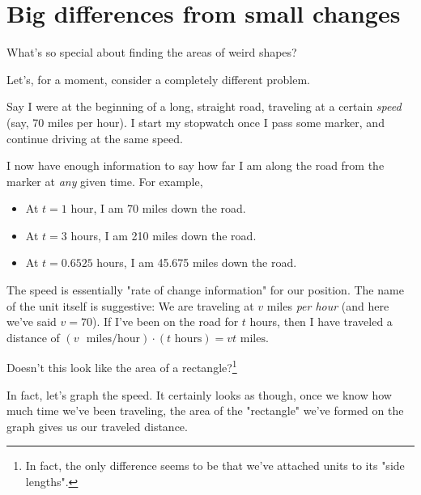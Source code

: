 \documentclass{article}
\begin{document}




\section{Big differences from small changes}



What's so special about finding the areas of weird shapes?

Let's, for a moment, consider a completely different problem.

Say I were at the beginning of a long, straight road, traveling at a certain \emph{speed} (say, 70 miles per hour). I start my stopwatch once I pass some marker, and continue driving at the same speed.

I now have enough information to say how far I am along the road from the marker at \emph{any} given time. For example, 

\begin{itemize}
\item At $t = 1$ hour, I am 70 miles down the road.
\item At $t = 3$ hours, I am 210 miles down the road.
\item At $t = 0.6525$ hours, I am 45.675 miles down the road.
\end{itemize}

The speed is essentially "rate of change information" for our position. The name of the unit itself is suggestive: We are traveling at $v$ miles \emph{per hour} (and here we've said $v = 70$). If I've been on the road for $t$ hours, then I have traveled a distance of $(v \text{ }\text{miles}/\text{hour}) \cdot (t\text{ hours}) = vt\text{ miles}$.

Doesn't this look like the area of a rectangle?\footnote{In fact, the only difference seems to be that we've attached units to its "side lengths".}

In fact, let's graph the speed. It certainly looks as though, once we know how much time we've been traveling, the area of the "rectangle" we've formed on the graph gives us our traveled distance.

\end{document}

